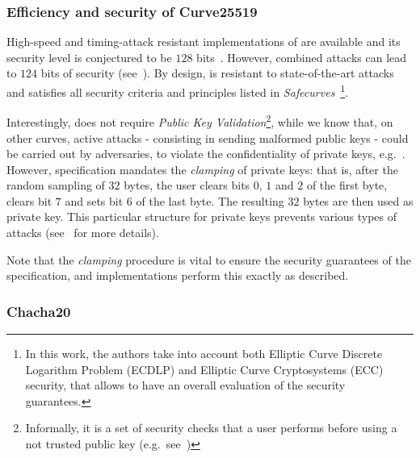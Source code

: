 \subsubsection{Efficiency and security of Curve25519}\label{instantiation:enc:algos:curve25519sec}
High-speed and timing-attack resistant implementations of  are available and its security level is conjectured to be $128$ bits~\cite[Section 1]{bernstein2006curve25519}. However, combined attacks can lead to $124$ bits of security (see~\cite[Section ``Twist Security'']{safecurves2017}). By design,  is resistant to state-of-the-art attacks and satisfies all security criteria and principles listed in \emph{Safecurves}~\cite{safecurves2017}\footnote{In this work, the authors take into account both Elliptic Curve Discrete Logarithm Problem (ECDLP) and Elliptic Curve Cryptosystems (ECC) security, that allows to have an overall evaluation of the security guarantees.}.

Interestingly,  does not require \emph{Public Key Validation}\footnote{Informally, it is a set of security checks that a user performs before using a not trusted public key (e.g.~see~\cite{barker2018recommendation})}, while we know that, on other curves, active attacks - consisting in sending malformed public keys - could be carried out by adversaries, to violate the confidentiality of private keys, e.g.~\cite{antipa2003validation}. However,  specification mandates the \emph{clamping} of private keys: that is, after the random sampling of $32$ bytes, the user clears bits $0$, $1$ and $2$ of the first byte, clears bit $7$ and sets bit $6$ of the last byte. The resulting $32$ bytes are then used as private key. This particular structure for private keys prevents various types of attacks (see~\cite[Section 3]{bernstein2006curve25519} for more details).

\begin{notebox}
    Note that the \emph{clamping} procedure is vital to ensure the security guarantees of the  specification, and implementations \MUST{} perform this exactly as described.
\end{notebox}

\subsubsection{Chacha20}\label{instantiation:enc:algos:chacha20}

